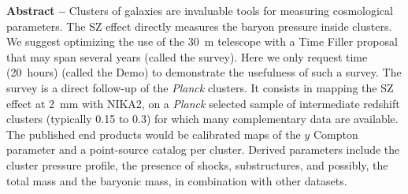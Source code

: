 \documentclass[10pt,a4paper,twoside,graphicx,color]{article}
\begin{document}
\vspace{-0.3cm}
       {\bf Abstract -- } Clusters of galaxies are invaluable tools
       for measuring cosmological parameters. The SZ effect directly
       measures the baryon pressure inside clusters. We suggest
       optimizing the use of the 30~m telescope with a Time Filler
       proposal that may span several years (called the survey). Here
       we only request time (20~hours) (called the Demo) to
       demonstrate the usefulness of such a survey. The survey is a
       direct follow-up of the {\sl Planck} clusters. It consists in
       mapping the SZ effect at 2~mm with NIKA2, on a {\sl Planck}
       selected sample of intermediate redshift clusters (typically
       0.15 to 0.3) for which many complementary data are
       available. The published end products would be calibrated maps
       of the $y$ Compton parameter and a point-source catalog per
       cluster. Derived parameters include the cluster pressure
       profile, the presence of shocks, substructures, and possibly,
       the total mass and the baryonic mass, in combination with other
       datasets.\\

\end{document}
